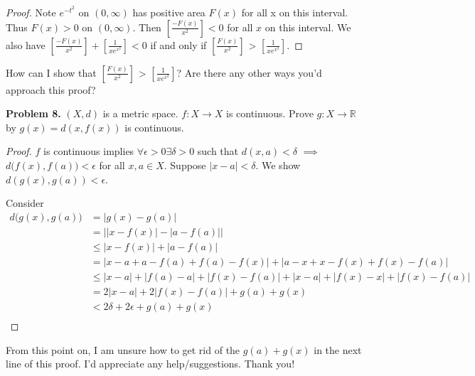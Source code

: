\documentclass[12pt]{article}
\begin{document}
\begin{flushleft}
\begin{proof}
Note $e^{-t^{2}}$ on $(0, \infty)$ has positive area $F(x)$ for all x on this interval. Thus $F(x)>0$ on $(0, \infty)$. Then $[\frac{-F(x)}{x^{2}}]<0$ for all $x$ on this interval. We also have $[\frac{-F(x)}{x^{2}}] + [\frac{1}{xe^{x^{2}}}] < 0$ if and only if $[\frac{F(x)}{x^{2}}]$ > $[\frac{1}{xe^{x^{2}}}]$.

\end{proof}

\color{red} How can I show that $[\frac{F(x)}{x^{2}}]$ > $[\frac{1}{xe^{x^{2}}}]$? Are there any other ways you'd approach this proof? 

\vspace{.2cm}


\color{black}

\textbf{Problem 8.} $(X,d)$ is a metric space. $f: X \rightarrow X$ is continuous. Prove $g: X \rightarrow \mathbb{R}$ by $g(x)=d(x, f(x))$ is continuous. 

\begin{proof} 

$f$ is continuous implies $\forall \epsilon > 0 \exists \delta > 0$ such that $d(x,a)<\delta$ $\implies$ $d\big( f(x), f(a) \big) < \epsilon$ for all $x, a \in X$. Suppose $|x-a|<\delta$. We show $d(g(x),g(a))<\epsilon$. 

Consider 
\begin{align*} 
d\big(g(x),g(a)\big) &= |g(x)-g(a)| \\
			      &= \big| |x-f(x)| - |a-f(a)| \big| \\
			      &\leq |x-f(x)|+|a-f(a)| \\
			      &= |x-a+a-f(a)+f(a)-f(x)| + |a-x+x-f(x)+f(x)-f(a)| \\
			      &\leq |x-a| + |f(a)-a| + |f(x)-f(a)| + |x-a| + |f(x)-x| + |f(x)-f(a)| \\
			      &= 2|x-a| + 2|f(x)-f(a)| + g(a) + g(x) \\
			      &< 2\delta + 2\epsilon + g(a) + g(x) \\
\end{align*}
\end{proof}

\color{red} From this point on, I am unsure how to get rid of the $g(a) + g(x)$ in the next line of this proof. I'd appreciate any help/suggestions. Thank you!

\vspace{.2cm}

\color{black}
\end{flushleft}
\end{document}
